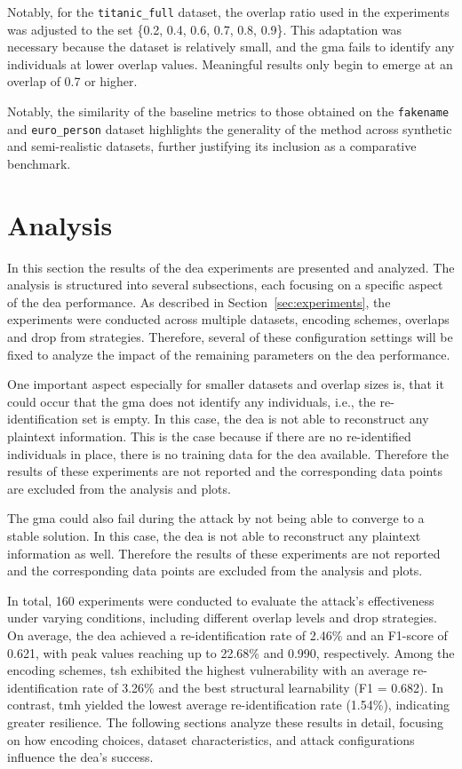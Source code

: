 Notably, for the \texttt{titanic\_full} dataset, the overlap ratio used in the experiments was adjusted to the set \{0.2, 0.4, 0.6, 0.7, 0.8, 0.9\}.
This adaptation was necessary because the dataset is relatively small, and the \ac{gma} fails to identify any individuals at lower overlap values.
Meaningful results only begin to emerge at an overlap of 0.7 or higher.

Notably, the similarity of the baseline metrics to those obtained on the \texttt{fakename} and \texttt{euro\_person} dataset highlights the generality of the method across synthetic and semi-realistic datasets, further justifying its inclusion as a comparative benchmark.

\section{Analysis}  \label{sec:analysis}

In this section the results of the \ac{dea} experiments are presented and analyzed.
The analysis is structured into several subsections, each focusing on a specific aspect of the \ac{dea} performance.
As described in Section~\ref{sec:experiments}, the experiments were conducted across multiple datasets, encoding schemes, overlaps and drop from strategies.
Therefore, several of these configuration settings will be fixed to analyze the impact of the remaining parameters on the \ac{dea} performance.

One important aspect especially for smaller datasets and overlap sizes is, that it could occur that the \ac{gma} does not identify any individuals, i.e., the re-identification set is empty.
In this case, the \ac{dea} is not able to reconstruct any plaintext information.
This is the case because if there are no re-identified individuals in place, there is no training data for the \ac{dea} available.
Therefore the results of these experiments are not reported and the corresponding data points are excluded from the analysis and plots.

The \ac{gma} could also fail during the attack by not being able to converge to a stable solution.
In this case, the \ac{dea} is not able to reconstruct any plaintext information as well.
Therefore the results of these experiments are not reported and the corresponding data points are excluded from the analysis and plots.

In total, 160 experiments were conducted to evaluate the attack's effectiveness under varying conditions, including different overlap levels and drop strategies.
On average, the \ac{dea} achieved a re-identification rate of 2.46\% and an F1-score of 0.621, with peak values reaching up to 22.68\% and 0.990, respectively.
Among the encoding schemes, \ac{tsh} exhibited the highest vulnerability with an average re-identification rate of 3.26\% and the best structural learnability (F1 = 0.682).
In contrast, \ac{tmh} yielded the lowest average re-identification rate (1.54\%), indicating greater resilience.
The following sections analyze these results in detail, focusing on how encoding choices, dataset characteristics, and attack configurations influence the \ac{dea}'s success.


